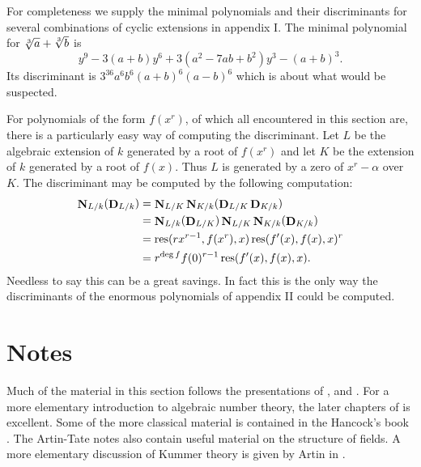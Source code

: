 For completeness we supply the minimal polynomials and their 
discriminants for several combinations of cyclic extensions in appendix I.
The minimal polynomial for $\root 3\of{a} + \root 3\of{b}$ is
\[
y^9 - 3 (a + b) y^6 + 3 (a^2 - 7 a b + b^2) y^3 - (a + b)^3.
\]
Its discriminant is $3^{36} a^6 b^6 (a + b)^6 (a - b)^6$ which is
about what would be suspected.

For polynomials of the form $f(x^r)$, of which all encountered
in this section are, there is a particularly easy way of computing the
discriminant.  Let $L$ be the algebraic extension of $k$ generated
by a root of $f(x^r)$ and let $K$ be the extension of $k$ generated
by a root of $f(x)$.  Thus $L$ is generated by a zero of 
$x^r - \alpha$ over $K$.  The discriminant may be computed by the following
computation:
\[
\begin{aligned}
\mathop{\mathbf{N}}\nolimits_{L/k}(\mathop{\mathbf{D}}\nolimits_{L/k}) &= 
\mathop{\mathbf{N}}\nolimits_{L/K}\mathop{\mathbf{N}}\nolimits_{K/k}(\mathop{\mathbf{D}}\nolimits_{L/K}\mathop{\mathbf{D}}\nolimits_{K/k}) \\
& = \mathop{\mathbf{N}}\nolimits_{L/k}(\mathop{\mathbf{D}}\nolimits_{L/K}) \mathop{\mathbf{N}}\nolimits_{L/K} \mathop{\mathbf{N}}\nolimits_{K/k}(\mathop{\mathbf{D}}\nolimits_{K/k})\\
& = \mathop{\rm res}\nolimits(r x^{r-1}, f(x^r), x) \mathop{\rm res}\nolimits(f^{\prime}(x), f(x), x)^r \\
& = r^{\deg f} f(0)^{r-1} \mathop{\rm res}\nolimits(f^{\prime}(x), f(x), x).
\end{aligned}
\]
Needless to say this can be a great savings.  In fact this is the only way
the discriminants of the enormous polynomials of appendix II could be
computed.


\section*{Notes}

\footnotesize

 Much of the material in this
section follows the presentations of {\Weyl} \cite{Weyl:ANT}, {\Lang}
\cite{Lang:ANT} and {\Serre} \cite{Serre:Corps:Locaux}.  For a more
elementary introduction to algebraic number theory, the later chapters
of \cite{Hardy:Wright} is excellent.  Some of the more classical
material is contained in the Hancock's book \cite{Hancock}.  The
Artin-Tate notes \cite{Artin:Tate} also contain useful material on the
structure of fields.  A more elementary discussion of Kummer theory is
given by Artin in \cite{Artin:Galois}.

\normalsize
